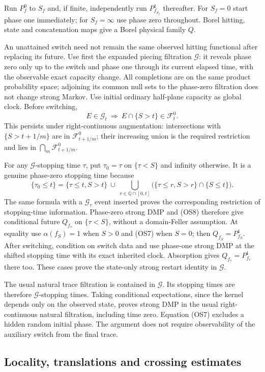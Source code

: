 Run $P^0_f$ to $S_f$ and, if finite, independently run
$P^1_{f_{S_f}}$ thereafter. For $S_f=0$ start phase one immediately;
for $S_f=\infty$ use phase zero throughout. Borel hitting, state
and concatenation maps give a Borel physical family $Q$.

An unattained switch need not remain the same observed hitting
functional after replacing its future. Use first the expanded
piecing filtration $\mathcal G$: it reveals phase zero only up to
the switch and phase one through its current elapsed time, with
the observable exact capacity change. All completions are on the
same product probability space; adjoining its common null sets to
the phase-zero filtration does not change strong Markov.
Use initial ordinary half-plane capacity as global clock.
Before switching,
\[
 E\in\mathcal G_t\ \Longrightarrow\
 E\cap\{S>t\}\in\mathcal F^0_t.
 \tag{OS9}
\]
This persists under right-continuous augmentation: intersections
with $\{S>t+1/m\}$ are in $\mathcal F^0_{t+1/m}$; their increasing
union is the required restriction and lies in
$\bigcap_m\mathcal F^0_{t+1/m}$.

For any $\mathcal G$-stopping time $\tau$, put $\tau_0=\tau$ on
$\{\tau<S\}$ and infinity otherwise. It is a genuine phase-zero
stopping time because
\[
 \{\tau_0\le t\}=\{\tau\le t,S>t\}\ \cup\
 \bigcup_{r\in\mathbb Q\cap[0,t]}
 \bigl(\{\tau\le r,S>r\}\cap\{S\le t\}\bigr).
 \tag{OS10}
\]
The same formula with a $\mathcal G_\tau$ event inserted proves
the corresponding restriction of stopping-time information.
Phase-zero strong DMP and (OS8) therefore give conditional future
$Q_{f_\tau}$ on $\{\tau<S\}$, without a domain-Feller assumption.
At equality use $\alpha(f_S)=1$ when $S>0$ and (OS7) when $S=0$;
then $Q_{f_S}=P^1_{f_S}$. After switching, condition on switch data
and use phase-one strong DMP at the shifted stopping time with its
exact inherited clock. Absorption gives
$Q_{f_\tau}=P^1_{f_\tau}$ there too.
These cases prove the state-only strong restart identity in
$\mathcal G$.

The usual natural trace filtration is contained in $\mathcal G$.
Its stopping times are therefore $\mathcal G$-stopping times.
Taking conditional expectations, since the kernel depends only on
the observed state, proves strong DMP in the usual right-continuous
natural filtration, including time zero. Equation (OS7) excludes
a hidden random initial phase. The argument does not require
observability of the auxiliary switch from the final trace.

\subsection{Locality, translations and crossing estimates}

